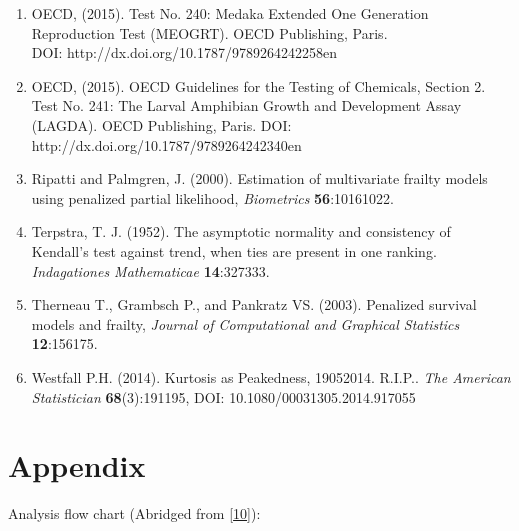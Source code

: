 \documentclass[a4paper]{article}
\begin{document}
\begin{enumerate}
 \item  \hypertarget{R10}{OECD, (2015). Test No. 240: Medaka Extended One Generation Reproduction Test (MEOGRT). OECD	
	Publishing, Paris. \\  DOI: http://dx.doi.org/10.1787/9789264242258\textemdash{}en }
	
 \item  \hypertarget{R11}{OECD, (2015). OECD Guidelines for the Testing of Chemicals, Section 2. Test No. 241: The Larval Amphibian Growth and Development Assay 
	(LAGDA). OECD Publishing, Paris. DOI: http://dx.doi.org/10.1787/9789264242340\textemdash{}en}
 
 \item  \hypertarget{R12}{Ripatti and  Palmgren, J. (2000). Estimation of multivariate frailty models using penalized partial likelihood, \textit{Biometrics} \textbf{56}:1016\textemdash{}1022. }
 
 \item  \hypertarget{R13}{Terpstra, T. J. (1952). The asymptotic normality and consistency of Kendall's test against trend, when ties are present in one ranking. \textit{Indagationes Mathematicae} \textbf{14}:327\textemdash{}333.}	

 \item  \hypertarget{R14}{Therneau T., Grambsch P., and  Pankratz VS. (2003). Penalized survival models and frailty, \textit{Journal of Computational and Graphical Statistics} \textbf{12}:156\textemdash{}175. }

 \item  \hypertarget{R15}{Westfall P.H. (2014). Kurtosis as Peakedness, 1905\textendash{}2014. R.I.P.. \textit{The American Statistician} \textbf{68}(3):191\textemdash{}195, DOI: 10.1080/00031305.2014.917055}

 \end{enumerate}
 



\section*{Appendix}
\label{sec:Appendix}
\thispagestyle{plain}
\hypertarget{fig:FlowChart}{} 


Analysis flow chart (Abridged from [\hyperlink{R10}{10}]): 
\end{document}
